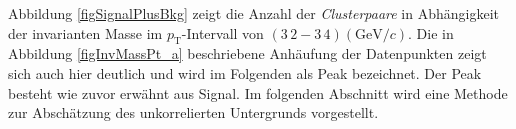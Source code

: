 \newline
Abbildung \ref{figSignalPlusBkg} zeigt die Anzahl der \textit{Clusterpaare} in Abhängigkeit der invarianten Masse im $p_{\text{T}}$-Intervall von $(3\,2 - 3\,4)(\text{GeV}/c)$.
Die in Abbildung \ref{figInvMassPt_a} beschriebene Anhäufung der Datenpunkten zeigt sich auch hier deutlich und wird im Folgenden als Peak bezeichnet.
Der Peak besteht wie zuvor erwähnt aus Signal.
\newline
Im folgenden Abschnitt wird eine Methode zur Abschätzung des unkorrelierten Untergrunds vorgestellt. 